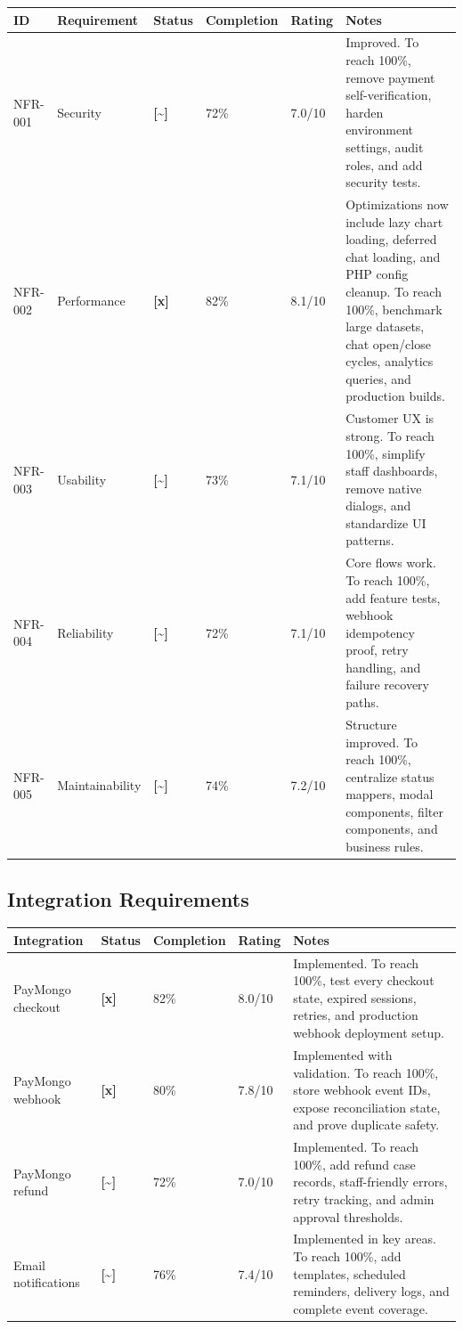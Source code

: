 \documentclass[11pt,a4paper]{article}
\newcommand{\statusdone}{\textbf{[x]}}
\newcommand{\statuspartial}{\textbf{[{\textasciitilde}]}}
\begin{document}
\begin{longtable}{L{0.15\textwidth} L{0.22\textwidth} C{0.08\textwidth} C{0.10\textwidth} C{0.10\textwidth} L{0.25\textwidth}}
\toprule
\textbf{ID} & \textbf{Requirement} & \textbf{Status} & \textbf{Completion} & \textbf{Rating} & \textbf{Notes} \\
\midrule
NFR-001 & Security & \statuspartial & 72\% & 7.0/10 & Improved. To reach 100\%, remove payment self-verification, harden environment settings, audit roles, and add security tests. \\
NFR-002 & Performance & \statusdone & 82\% & 8.1/10 & Optimizations now include lazy chart loading, deferred chat loading, and PHP config cleanup. To reach 100\%, benchmark large datasets, chat open/close cycles, analytics queries, and production builds. \\
NFR-003 & Usability & \statuspartial & 73\% & 7.1/10 & Customer UX is strong. To reach 100\%, simplify staff dashboards, remove native dialogs, and standardize UI patterns. \\
NFR-004 & Reliability & \statuspartial & 72\% & 7.1/10 & Core flows work. To reach 100\%, add feature tests, webhook idempotency proof, retry handling, and failure recovery paths. \\
NFR-005 & Maintainability & \statuspartial & 74\% & 7.2/10 & Structure improved. To reach 100\%, centralize status mappers, modal components, filter components, and business rules. \\
\bottomrule
\end{longtable}

\subsection{Integration Requirements}

\begin{longtable}{L{0.24\textwidth} C{0.08\textwidth} C{0.10\textwidth} C{0.10\textwidth} L{0.36\textwidth}}
\toprule
\textbf{Integration} & \textbf{Status} & \textbf{Completion} & \textbf{Rating} & \textbf{Notes} \\
\midrule
PayMongo checkout & \statusdone & 82\% & 8.0/10 & Implemented. To reach 100\%, test every checkout state, expired sessions, retries, and production webhook deployment setup. \\
PayMongo webhook & \statusdone & 80\% & 7.8/10 & Implemented with validation. To reach 100\%, store webhook event IDs, expose reconciliation state, and prove duplicate safety. \\
PayMongo refund & \statuspartial & 72\% & 7.0/10 & Implemented. To reach 100\%, add refund case records, staff-friendly errors, retry tracking, and admin approval thresholds. \\
Email notifications & \statuspartial & 76\% & 7.4/10 & Implemented in key areas. To reach 100\%, add templates, scheduled reminders, delivery logs, and complete event coverage. \\
\bottomrule
\end{longtable}
\end{document}
